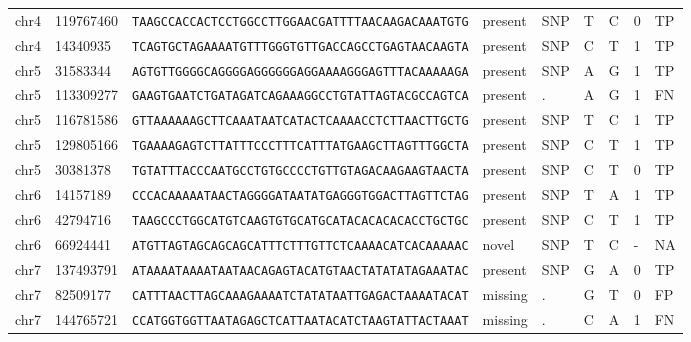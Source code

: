 \begin{landscape}
\begin{table}[]
\begin{tabular}{@{}lllllllll@{}}
chr4  & 119767460 & \texttt{TAAGCCACCACTCCTGGCCTTGGAACGATTTTAACAAGACAAATGTG} & present            & SNP       & T        & C                   & 0         & TP     \\
chr4  & 14340935  & \texttt{TCAGTGCTAGAAAATGTTTGGGTGTTGACCAGCCTGAGTAACAAGTA} & present            & SNP       & C        & T                   & 1         & TP     \\
chr5  & 31583344  & \texttt{AGTGTTGGGGCAGGGGAGGGGGGAGGAAAAGGGAGTTTACAAAAAGA} & present            & SNP       & A        & G                   & 1         & TP     \\
chr5  & 113309277 & \texttt{GAAGTGAATCTGATAGATCAGAAAGGCCTGTATTAGTACGCCAGTCA} & present            & .         & A        & G                   & 1         & FN     \\
chr5  & 116781586 & \texttt{GTTAAAAAAGCTTCAAATAATCATACTCAAAACCTCTTAACTTGCTG} & present            & SNP       & T        & C                   & 1         & TP     \\
chr5  & 129805166 & \texttt{TGAAAAGAGTCTTATTTCCCTTTCATTTATGAAGCTTAGTTTGGCTA} & present            & SNP       & C        & T                   & 1         & TP     \\
chr5  & 30381378  & \texttt{TGTATTTACCCAATGCCTGTGCCCCTGTTGTAGACAAGAAGTAACTA} & present            & SNP       & C        & T                   & 0         & TP     \\
chr6  & 14157189  & \texttt{CCCACAAAAATAACTAGGGGATAATATGAGGGTGGACTTAGTTCTAG} & present            & SNP       & T        & A                   & 1         & TP     \\
chr6  & 42794716  & \texttt{TAAGCCCTGGCATGTCAAGTGTGCATGCATACACACACACCTGCTGC} & present            & SNP       & C        & T                   & 1         & TP     \\
chr6  & 66924441  & \texttt{ATGTTAGTAGCAGCAGCATTTCTTTGTTCTCAAAACATCACAAAAAC} & novel              & SNP       & T        & C                   & -         & NA     \\
chr7  & 137493791 & \texttt{ATAAAATAAAATAATAACAGAGTACATGTAACTATATATAGAAATAC} & present            & SNP       & G        & A                   & 0         & TP     \\
chr7  & 82509177  & \texttt{CATTTAACTTAGCAAAGAAAATCTATATAATTGAGACTAAAATACAT} & missing            & .         & G        & T                   & 0         & FP     \\
chr7  & 144765721 & \texttt{CCATGGTGGTTAATAGAGCTCATTAATACATCTAAGTATTACTAAAT} & missing            & .         & C        & A                   & 1         & FN     \\

\end{tabular}
\end{table}
\end{landscape}
